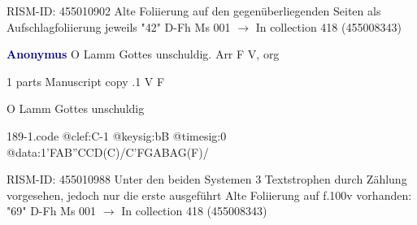 \documentclass[twocolumn]{book}
\begin{document}
\newline RISM-ID: 455010902
\newline Alte Foliierung auf den gegenüberliegenden Seiten als Aufschlagfoliierung jeweils "42"
\newline D-Fh  Ms 001
\newline $\rightarrow$ In collection 418 (455008343)

\newline \par \vspace{7pt} \textcolor{darkblue}{\textbf{Anonymus  }}
\newline O Lamm Gottes unschuldig. Arr  F  
\newline V, org
\newline \begin{itshape}\end{itshape} 
\newline \textcolor{darkblue}{}  1 parts  
\newline Manuscript copy
.1  V  F
\newline \begin{footnotesize} O Lamm Gottes unschuldig \end{footnotesize}  
\begin{filecontents*}{189-1.code}
@clef:C-1
@keysig:bB
@timesig:0
@data:1'FAB''CCD(C)/C'FGABAG(F)/
\end{filecontents*}
\newline
%

\newline RISM-ID: 455010988
\newline Unter den beiden Systemen 3 Textstrophen durch Zählung vorgesehen, jedoch nur die erste ausgeführt
\newline Alte Foliierung auf f.100v vorhanden: "69"
\newline D-Fh  Ms 001
\newline $\rightarrow$ In collection 418 (455008343)
\end{document}

